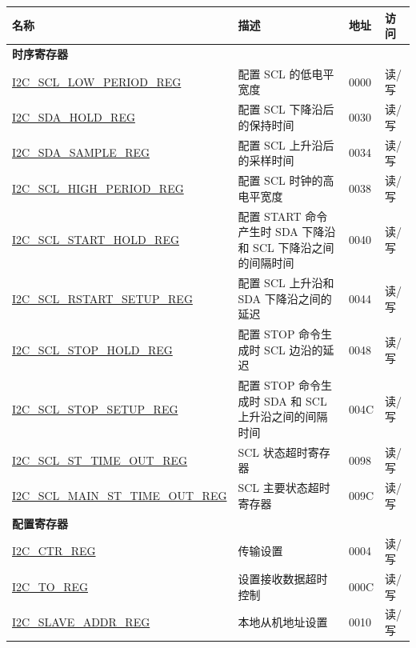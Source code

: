 \begin{longtable}{ | m{6cm} | p{7.2cm} | p{1.3cm} | p{1cm} | }
\hline\rowcolor{lightgray}
名称 & 描述 &  地址 & 访问 \\ \hline
\endhead
\multicolumn{4}{|l|}{\textbf{时序寄存器}} \\ \hline
\hyperref[regdesc:I2CSCLLOWPERIODREG]{I2C\_SCL\_LOW\_PERIOD\_REG} & 配置 SCL 的低电平宽度 & \hexprefix{}0000 & 读/写 \\ \hline
\hyperref[regdesc:I2CSDAHOLDREG]{I2C\_SDA\_HOLD\_REG} & 配置 SCL 下降沿后的保持时间 & \hexprefix{}0030 & 读/写 \\ \hline
\hyperref[regdesc:I2CSDASAMPLEREG]{I2C\_SDA\_SAMPLE\_REG} & 配置 SCL 上升沿后的采样时间 & \hexprefix{}0034 & 读/写 \\ \hline
\hyperref[regdesc:I2CSCLHIGHPERIODREG]{I2C\_SCL\_HIGH\_PERIOD\_REG} & 配置 SCL 时钟的高电平宽度 & \hexprefix{}0038 & 读/写 \\ \hline
\hyperref[regdesc:I2CSCLSTARTHOLDREG]{I2C\_SCL\_START\_HOLD\_REG} & 配置 START 命令产生时 SDA 下降沿和 SCL 下降沿之间的间隔时间 & \hexprefix{}0040 & 读/写 \\ \hline
\hyperref[regdesc:I2CSCLRSTARTSETUPREG]{I2C\_SCL\_RSTART\_SETUP\_REG} & 配置 SCL 上升沿和 SDA 下降沿之间的延迟 & \hexprefix{}0044 & 读/写 \\ \hline
\hyperref[regdesc:I2CSCLSTOPHOLDREG]{I2C\_SCL\_STOP\_HOLD\_REG} & 配置 STOP 命令生成时 SCL 边沿的延迟 & \hexprefix{}0048 & 读/写 \\ \hline
\hyperref[regdesc:I2CSCLSTOPSETUPREG]{I2C\_SCL\_STOP\_SETUP\_REG} & 配置 STOP 命令生成时 SDA 和 SCL 上升沿之间的间隔时间 & \hexprefix{}004C & 读/写 \\ \hline
\hyperref[regdesc:I2CSCLSTTIMEOUTREG]{I2C\_SCL\_ST\_TIME\_OUT\_REG} & SCL 状态超时寄存器 & \hexprefix{}0098 & 读/写 \\ \hline
\hyperref[regdesc:I2CSCLMAINSTTIMEOUTREG]{I2C\_SCL\_MAIN\_ST\_TIME\_OUT\_REG} & SCL 主要状态超时寄存器 & \hexprefix{}009C & 读/写 \\ \hline
\multicolumn{4}{|l|}{\textbf{配置寄存器}} \\ \hline
\hyperref[regdesc:I2CCTRREG]{I2C\_CTR\_REG} & 传输设置 & \hexprefix{}0004 & 读/写 \\ \hline
\hyperref[regdesc:I2CTOREG]{I2C\_TO\_REG} & 设置接收数据超时控制 & \hexprefix{}000C & 读/写 \\ \hline
\hyperref[regdesc:I2CSLAVEADDRREG]{I2C\_SLAVE\_ADDR\_REG} & 本地从机地址设置 & \hexprefix{}0010 & 读/写 \\ \hline

\end{longtable}

